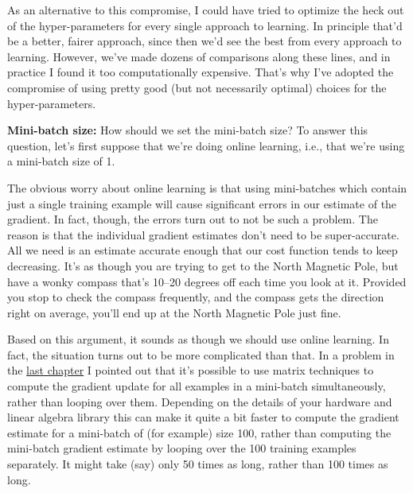 \documentclass[a4paper,twoside,10pt]{book}
\begin{document}
As an alternative to this compromise, I could have tried to optimize the heck out of the hyper-parameters for every single approach to learning. In principle that'd be a better, fairer approach, since then we'd see the best from every approach to learning. However, we've made dozens of comparisons along these lines, and in practice I found it too computationally expensive. That's why I've adopted the compromise of using pretty good (but not necessarily optimal) choices for the hyper-parameters.


\textbf{Mini-batch size:} How should we set the mini-batch size? To answer this question, let's first suppose that we're doing online learning, i.e., that we're using a mini-batch size of 1.

The obvious worry about online learning is that using mini-batches which contain just a single training example will cause significant errors in our estimate of the gradient. In fact, though, the errors turn out to not be such a problem. The reason is that the individual gradient estimates don't need to be super-accurate. All we need is an estimate accurate enough that our cost function tends to keep decreasing. It's as though you are trying to get to the North Magnetic Pole, but have a wonky compass that's 10--20 degrees off each time you look at it. Provided you stop to check the compass frequently, and the compass gets the direction right on average, you'll end up at the North Magnetic Pole just fine.

Based on this argument, it sounds as though we should use online learning. In fact, the situation turns out to be more complicated than that. In a problem in the \hyperref[backprop_over_minibatch]{last chapter} I pointed out that it's possible to use matrix techniques to compute the gradient update for all examples in a mini-batch simultaneously, rather than looping over them. Depending on the details of your hardware and linear algebra library this can make it quite a bit faster to compute the gradient estimate for a mini-batch of (for example) size 100, rather than computing the mini-batch gradient estimate by looping over the 100 training examples separately. It might take (say) only 50 times as long, rather than 100 times as long.
\end{document}
